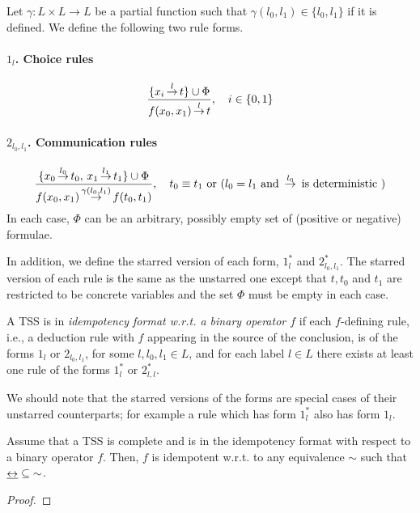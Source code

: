 \begin{definition}
\label{def::format}
Let $\gamma: L \times L \rightarrow L$ be a partial function such that $\gamma(l_0,l_1) \in \{l_0,l_1\}$ if it is defined.
We define the following two rule forms.

\paragraph{$1_l$. Choice rules}
\[
    \sosrule[i\in\{0,1\}]{\{x_i\trans{l}t\}\cup\Phi}{f(x_0,x_1)\trans{l}t} \\
\]
\paragraph{$2_{l_0,l_1}$. Communication rules}
\[
    \sosrule[t_0\equiv t_1 \mbox{ or } (l_0=l_1 \mbox{ and }  \trans{l_0}\textrm{ is deterministic } )]{\{x_0\trans{l_0}t_0,\, x_1\trans{l_1}t_1\}\cup\Phi}{f(x_0,x_1)\trans{\gamma(l_0,l_1)}f(t_0,t_1)}
\]
In each case, $\Phi$ can be an arbitrary, possibly empty set of (positive or negative) formulae.

In addition, we define the starred version of each form, $1_l^*$ and $2_{l_0,l_1}^*$. The starred version of each rule is the
same as the unstarred one except that $t, t_0$ and $t_1$ are restricted to be concrete variables and the set $\Phi$ must be
empty in each case.

A TSS is in \emph{idempotency format w.r.t. a binary operator $f$} if each \mbox{$f$-defining} rule, i.e., a deduction rule with $f$ appearing in the source of the conclusion, is of the forms $1_l$
or $2_{l_0,l_1}$, for some $l, l_0, l_1 \in L$, and for each label $l \in L$ there exists at least one rule of the forms $1_l^*$ or $2_{l,l}^*$.
\end{definition}

We should note that the starred versions of the forms are special cases of their unstarred counterparts; for example a rule
which has form $1_l^*$ also has form $1_l$.


\begin{theorem}\label{thm:idempotent}
Assume that  a TSS is complete and is in the idempotency format with respect to a binary operator $f$. Then,  $f$ is idempotent w.r.t. to
any equivalence $\sim$ such that  $\mathbin{\mbox{$\underline{\leftrightarrow}$}} \subseteq{\sim}$.
\end{theorem}
\begin{proof}

\end{proof}


